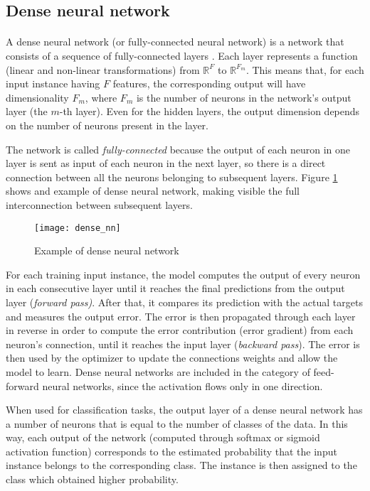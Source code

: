 \subsection{Dense neural network}
\paragraph{} A dense neural network (or fully-connected neural network) is a network that consists of a sequence of fully-connected layers \cite{OReilly:TFforDL}. Each layer represents a function (linear and non-linear transformations) from $\mathbb{R}^F$ to $\mathbb{R}^{F_m}$. This means that, for each input instance having $F$ features, the corresponding output will have dimensionality $F_m$, where $F_m$ is the number of neurons in the network's output layer (the $m$-th layer). Even for the hidden layers, the output dimension depends on the number of neurons present in the layer.

The network is called \textit{fully-connected} because the output of each neuron in one layer is sent as input of each neuron in the next layer, so there is a direct connection between all the neurons belonging to subsequent layers. Figure \ref{fig:dense_nn} shows and example of dense neural network, making visible the full interconnection between subsequent layers.
\begin{figure}[htbp]
    \centering
    \texttt{[image: dense\_nn]}
    \caption{Example of dense neural network}
    \label{fig:dense_nn}
\end{figure}

For each training input instance, the model computes the output of every neuron in each consecutive layer until it reaches the final predictions from the output layer (\textit{forward pass)}. After that, it compares its prediction with the actual targets and measures the output error. The error is then propagated through each layer in reverse in order to compute the error contribution (error gradient) from each neuron's connection, until it reaches the input layer (\textit{backward pass}). The error is then used by the optimizer to update the connections weights and allow the model to learn. Dense neural networks are included in the category of feed-forward neural networks, since the activation flows only in one direction.

When used for classification tasks, the output layer of a dense neural network has a number of neurons that is equal to the number of classes of the data. In this way, each output of the network (computed through softmax or sigmoid activation function) corresponds to the estimated probability that the input instance belongs to the corresponding class. The instance is then assigned to the class which obtained higher probability.

